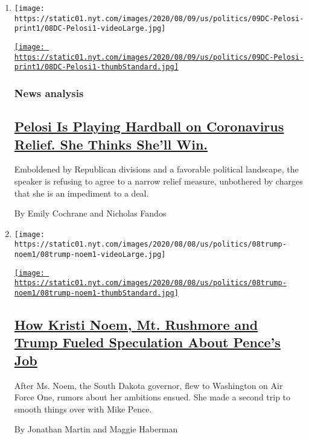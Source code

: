 \begin{enumerate}
\def\labelenumi{\arabic{enumi}.}
\item
  \texttt{[image: https://static01.nyt.com/images/2020/08/09/us/politics/09DC-Pelosi-print1/08DC-Pelosi1-videoLarge.jpg]}

  \href{/2020/08/08/us/politics/nancy-pelosi-coronavirus-relief.html}{\texttt{[image: https://static01.nyt.com/images/2020/08/09/us/politics/09DC-Pelosi-print1/08DC-Pelosi1-thumbStandard.jpg]}}

  \hypertarget{news-analysis}{%
  \subsubsection{News analysis}\label{news-analysis}}

  \hypertarget{pelosi-is-playing-hardball-on-coronavirus-relief-she-thinks-shell-win}{%
  \subsection{\texorpdfstring{\href{/2020/08/08/us/politics/nancy-pelosi-coronavirus-relief.html}{Pelosi
  Is Playing Hardball on Coronavirus Relief. She Thinks She'll
  Win.}}{Pelosi Is Playing Hardball on Coronavirus Relief. She Thinks She'll Win.}}\label{pelosi-is-playing-hardball-on-coronavirus-relief-she-thinks-shell-win}}

  Emboldened by Republican divisions and a favorable political
  landscape, the speaker is refusing to agree to a narrow relief
  measure, unbothered by charges that she is an impediment to a deal.

  By Emily Cochrane and Nicholas Fandos
\item
  \texttt{[image: https://static01.nyt.com/images/2020/08/08/us/politics/08trump-noem1/08trump-noem1-videoLarge.jpg]}

  \href{/2020/08/08/us/politics/kristi-noem-pence-trump.html}{\texttt{[image: https://static01.nyt.com/images/2020/08/08/us/politics/08trump-noem1/08trump-noem1-thumbStandard.jpg]}}

  \hypertarget{how-kristi-noem-mt-rushmore-and-trump-fueled-speculation-about-pences-job}{%
  \subsection{\texorpdfstring{\href{/2020/08/08/us/politics/kristi-noem-pence-trump.html}{How
  Kristi Noem, Mt. Rushmore and Trump Fueled Speculation About Pence's
  Job}}{How Kristi Noem, Mt. Rushmore and Trump Fueled Speculation About Pence's Job}}\label{how-kristi-noem-mt-rushmore-and-trump-fueled-speculation-about-pences-job}}

  After Ms. Noem, the South Dakota governor, flew to Washington on Air
  Force One, rumors about her ambitions ensued. She made a second trip
  to smooth things over with Mike Pence.

  By Jonathan Martin and Maggie Haberman
\end{enumerate}

